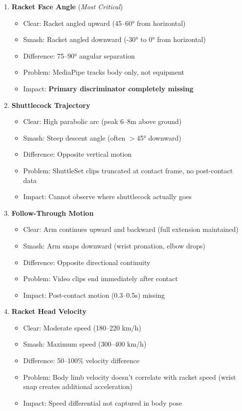 \documentclass[11pt,a4paper]{article}
\begin{document}
\begin{enumerate}
\item \textbf{Racket Face Angle} (\textit{Most Critical})
   \begin{itemize}
   \item Clear: Racket angled upward (45--60° from horizontal)
   \item Smash: Racket angled downward (-30° to 0° from horizontal)
   \item Difference: 75--90° angular separation
   \item Problem: MediaPipe tracks body only, not equipment
   \item Impact: \textbf{Primary discriminator completely missing}
   \end{itemize}

\item \textbf{Shuttlecock Trajectory}
   \begin{itemize}
   \item Clear: High parabolic arc (peak 6--8m above ground)
   \item Smash: Steep descent angle (often $>$45° downward)
   \item Difference: Opposite vertical motion
   \item Problem: ShuttleSet clips truncated at contact frame, no post-contact data
   \item Impact: Cannot observe where shuttlecock actually goes
   \end{itemize}

\item \textbf{Follow-Through Motion}
   \begin{itemize}
   \item Clear: Arm continues upward and backward (full extension maintained)
   \item Smash: Arm snaps downward (wrist pronation, elbow drops)
   \item Difference: Opposite directional continuity
   \item Problem: Video clips end immediately after contact
   \item Impact: Post-contact motion (0.3--0.5s) missing
   \end{itemize}

\item \textbf{Racket Head Velocity}
   \begin{itemize}
   \item Clear: Moderate speed (180--220 km/h)
   \item Smash: Maximum speed (300--400 km/h)
   \item Difference: 50--100\% velocity difference
   \item Problem: Body limb velocity doesn't correlate with racket speed (wrist snap creates additional acceleration)
   \item Impact: Speed differential not captured in body pose
   \end{itemize}
\end{enumerate}
\end{document}
